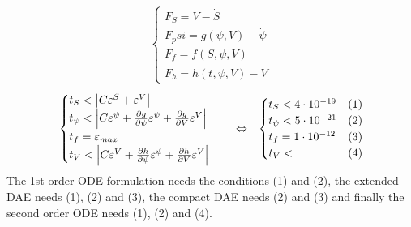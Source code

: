 \begin{align}
	\begin{cases}
		F_S = V - \dot{S} \\ F_psi = g(\psi,V) - \dot{\psi} \\ F_f = f(S,\psi,V) \\ F_h = h(t,\psi,V) - \dot{V}
	\end{cases}
\end{align}
\begin{align}
	&\begin{cases}
	t_S < \left|C\varepsilon^S + \varepsilon^V\right| \\
	t_\psi < \left|C\varepsilon^\psi + \pdv{g}{\psi}\varepsilon^\psi + \pdv{g}{V}\varepsilon^V\right| \\
	t_f = \varepsilon_{max} \\
	t_V < \left|C\varepsilon^V + \pdv{h}{\psi}\varepsilon^\psi + \pdv{h}{V}\varepsilon^V\right|
	\end{cases} &&\Leftrightarrow&
	\begin{cases}
	t_S < 4\cdot10^{-19} & (1)\\ 
	t_\psi < 5\cdot10^{-21} & (2)\\
	t_f = 1\cdot10^{-12} & (3) \\
	t_V < & (4)
	\end{cases}
\end{align}
The 1st order ODE formulation needs the conditions (1) and (2), the extended DAE needs (1), (2) and (3), the compact DAE needs (2) and (3) and finally the second order ODE needs (1), (2) and (4). 

